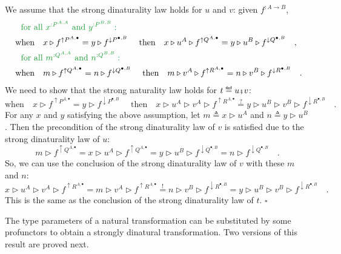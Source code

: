 We assume that the strong dinaturality law holds for $u$ and $v$:
given $f^{:A\rightarrow B}$,
\begin{align*}
 & \quad{\color{greenunder}\text{for all }x^{:P^{A,A}}\text{ and }y^{:P^{B,B}}:}\quad\\
 & \text{ when}\quad x\triangleright f^{\uparrow P^{A,\bullet}}=y\triangleright f^{\downarrow P^{\bullet,B}}\quad\text{ then}\quad x\triangleright u^{A}\triangleright f^{\uparrow Q^{A,\bullet}}=y\triangleright u^{B}\triangleright f^{\downarrow Q^{\bullet,B}}\quad,\\
 & \quad{\color{greenunder}\text{for all }m^{:Q^{A,A}}\text{ and }n^{:Q^{B,B}}:}\quad\\
 & \text{ when}\quad m\triangleright f^{\uparrow Q^{A,\bullet}}=n\triangleright f^{\downarrow Q^{\bullet,B}}\quad\text{ then}\quad m\triangleright v^{A}\triangleright f^{\uparrow R^{A,\bullet}}=n\triangleright v^{B}\triangleright f^{\downarrow R^{\bullet,B}}\quad.
\end{align*}
We need to show that the strong naturality law holds for $t\triangleq u\bef v$:
\[
\text{when}\quad x\triangleright f^{\uparrow P^{A,\bullet}}=y\triangleright f^{\downarrow P^{\bullet,B}}\quad\text{ then}\quad x\triangleright u^{A}\triangleright v^{A}\triangleright f^{\uparrow R^{A,\bullet}}\overset{?}{=}y\triangleright u^{B}\triangleright v^{B}\triangleright f^{\downarrow R^{\bullet,B}}\quad.
\]
For any $x$ and $y$ satisfying the above assumption, let $m\triangleq x\triangleright u^{A}$
and $n\triangleq y\triangleright u^{B}$. Then the precondition of
the strong dinaturality law of $v$ is satisfied due to the strong
dinaturality law of $u$:
\[
m\triangleright f^{\uparrow Q^{A,\bullet}}=x\triangleright u^{A}\triangleright f^{\uparrow Q^{A,\bullet}}=y\triangleright u^{B}\triangleright f^{\downarrow Q^{\bullet,B}}=n\triangleright f^{\downarrow Q^{\bullet,B}}\quad.
\]
So, we can use the conclusion of the strong dinaturality law of $v$
with these $m$ and $n$:
\[
x\triangleright u^{A}\triangleright v^{A}\triangleright f^{\uparrow R^{A,\bullet}}=m\triangleright v^{A}\triangleright f^{\uparrow R^{A,\bullet}}\overset{!}{=}n\triangleright v^{B}\triangleright f^{\downarrow R^{\bullet,B}}=y\triangleright u^{B}\triangleright v^{B}\triangleright f^{\downarrow R^{\bullet,B}}\quad.
\]
This is the same as the conclusion of the strong dinaturality law
of $t$. $\square$

The type parameters of a natural transformation can be substituted
by some profunctors to obtain a strongly dinatural transformation.
Two versions of this result are proved next.

